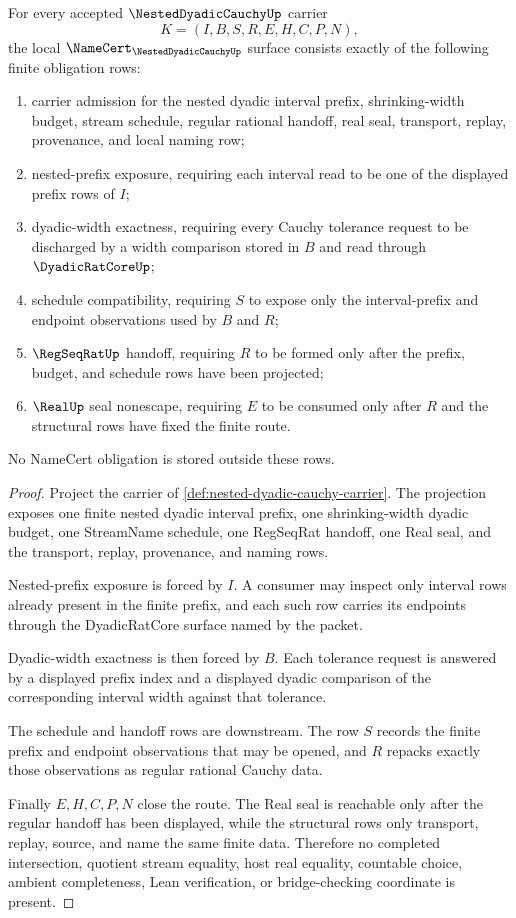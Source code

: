 \begin{theorem}
\label{thm:nested-dyadic-cauchy-namecert-obligations}
For every accepted $\NestedDyadicCauchyUp$ carrier
$$
K=(I,B,S,R,E,H,C,P,N),
$$
the local $\NameCert_{\NestedDyadicCauchyUp}$ surface consists exactly of the following finite obligation rows:
\begin{enumerate}
\item carrier admission for the nested dyadic interval prefix, shrinking-width budget, stream schedule, regular rational handoff, real seal, transport, replay, provenance, and local naming row;
\item nested-prefix exposure, requiring each interval read to be one of the displayed prefix rows of $I$;
\item dyadic-width exactness, requiring every Cauchy tolerance request to be discharged by a width comparison stored in $B$ and read through $\DyadicRatCoreUp$;
\item schedule compatibility, requiring $S$ to expose only the interval-prefix and endpoint observations used by $B$ and $R$;
\item $\RegSeqRatUp$ handoff, requiring $R$ to be formed only after the prefix, budget, and schedule rows have been projected;
\item $\RealUp$ seal nonescape, requiring $E$ to be consumed only after $R$ and the structural rows have fixed the finite route.
\end{enumerate}
No NameCert obligation is stored outside these rows.
\end{theorem}
\begin{proof}
Project the carrier of \autoref{def:nested-dyadic-cauchy-carrier}. The projection exposes one finite nested dyadic interval prefix, one shrinking-width dyadic budget, one StreamName schedule, one RegSeqRat handoff, one Real seal, and the transport, replay, provenance, and naming rows.

Nested-prefix exposure is forced by $I$. A consumer may inspect only interval rows already present in the finite prefix, and each such row carries its endpoints through the DyadicRatCore surface named by the packet.

Dyadic-width exactness is then forced by $B$. Each tolerance request is answered by a displayed prefix index and a displayed dyadic comparison of the corresponding interval width against that tolerance.

The schedule and handoff rows are downstream. The row $S$ records the finite prefix and endpoint observations that may be opened, and $R$ repacks exactly those observations as regular rational Cauchy data.

Finally $E,H,C,P,N$ close the route. The Real seal is reachable only after the regular handoff has been displayed, while the structural rows only transport, replay, source, and name the same finite data. Therefore no completed intersection, quotient stream equality, host real equality, countable choice, ambient completeness, Lean verification, or bridge-checking coordinate is present.
\end{proof}

